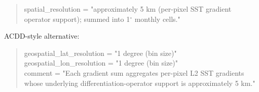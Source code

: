 \documentclass[11pt]{article}
\begin{document}
\begin{quote}\ttfamily
spatial\_resolution = "approximately 5 km (per-pixel SST gradient
operator support); summed into 1$^\circ$ monthly cells."
\end{quote}

ACDD-style alternative:

\begin{quote}\ttfamily
geospatial\_lat\_resolution = "1 degree (bin size)"\\
geospatial\_lon\_resolution = "1 degree (bin size)"\\
comment = "Each gradient sum aggregates per-pixel L2 SST gradients
whose underlying differentiation-operator support is approximately
5 km."
\end{quote}
\end{document}
